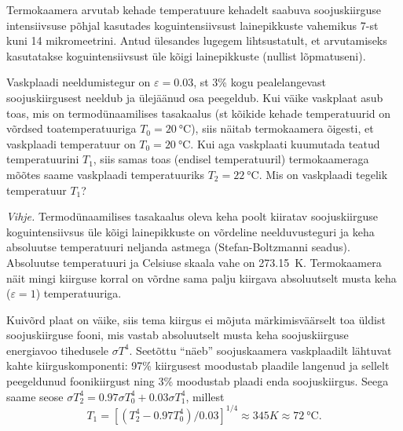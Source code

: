 
Termokaamera arvutab kehade temperatuure kehadelt saabuva soojuskiirguse intensiivsuse põhjal kasutades koguintensiivsust lainepikkuste vahemikus 7-st kuni 14 mikromeetrini. Antud ülesandes lugegem lihtsustatult, et arvutamiseks kasutatakse koguintensiivsust üle kõigi lainepikkuste (nullist lõpmatuseni). 
	
	Vaskplaadi neeldumistegur on $\varepsilon = \num{0.03}$, st 3\% kogu pealelangevast soojuskiirgusest neeldub ja ülejäänud osa peegeldub. Kui väike vaskplaat asub toas, mis on termodünaamilises tasakaalus (st kõikide kehade temperatuurid on võrdsed toatemperatuuriga $T_0=\SI {20}\celsius$), siis näitab termokaamera õigesti, et vaskplaadi temperatuur on $T_0=\SI {20}\celsius$. Kui aga  vaskplaati kuumutada teatud temperatuurini $T_1$, siis samas toas (endisel temperatuuril) termokaameraga mõõtes saame vaskplaadi temperatuuriks $T_2=\SI {22}\celsius$. Mis on vaskplaadi tegelik temperatuur $T_1$?
	
	\textit{Vihje.} Termodünaamilises tasakaalus oleva keha poolt kiiratav soojuskiirguse koguintensiivsus üle kõigi lainepikkuste on võrdeline neelduvusteguri ja keha absoluutse temperatuuri neljanda astmega (Stefan-Boltzmanni seadus). Absoluutse temperatuuri ja Celsiuse skaala vahe on \SI{273.15}{K}. Termokaamera näit mingi kiirguse korral on võrdne sama palju kiirgava absoluutselt musta keha ($\varepsilon = 1$) temperatuuriga.
	
	
	
	
	
	
	
\hint

\solu
Kuivõrd plaat on väike, siis tema kiirgus ei mõjuta märkimisväärselt toa üldist soojuskiirguse fooni, mis vastab absoluutselt musta keha soojuskiirguse energiavoo tihedusele $\sigma T^4$. Seetõttu ``näeb'' soojuskaamera vaskplaadilt lähtuvat kahte kiirguskomponenti: 97\% kiirgusest moodustab plaadile langenud ja sellelt peegeldunud foonikiirgust ning 3\% moodustab plaadi enda soojuskiirgus. Seega saame seose $\sigma T_2^4= \num{0.97}\sigma T_0^4+\num{0.03}\sigma T_1^4$, millest 
$$T_1=[(T_2^4-\num{0.97}T_0^4)/\num{0.03}]^{1/4}\approx \SI {345}K\approx \SI{72}\celsius.$$
\probend